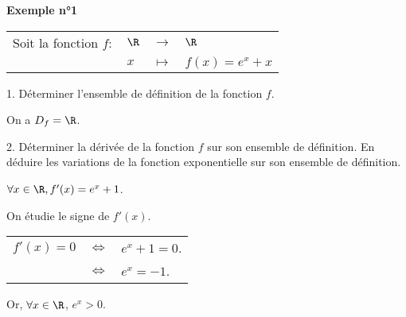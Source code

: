 \vspace*{-.1cm}

\textbf{Exemple n°1} \\

\vspace*{-.2cm}

\begin{tabular}{llll}
\hspace*{-.3cm} Soit la fonction $f:$ & $\R$ & $\longrightarrow$ & $\R$ \\
& $x$ & $\longmapsto$ & $f(x) = e^x + x$
\end{tabular}

\vspace*{.3cm}

1. Déterminer l'ensemble de définition de la fonction $f$. \\

\vspace*{-.2cm}

On a $D_f = \R$. \\

\vspace*{-.2cm}

2. Déterminer la dérivée de la fonction $f$ sur son ensemble de définition. En déduire les variations de la fonction exponentielle sur son ensemble de définition. \\

\vspace*{-.2cm}

$\forall x \in \R, f'(x) = e^x + 1$. \\

\vspace*{-.2cm}

On étudie le signe de $f'(x)$. \\

\vspace*{-.2cm}

\begin{tabular}{lll}
\hspace*{-.3cm} $f'(x) = 0$ & $\Longleftrightarrow$ & $e^x + 1 = 0$. \\
& $\Longleftrightarrow$ & $e^x = -1$. \\
\end{tabular}

\vspace*{.3cm}

Or, $\forall x \in \R$, $e^x > 0$. \\

\vspace*{-.2cm}


